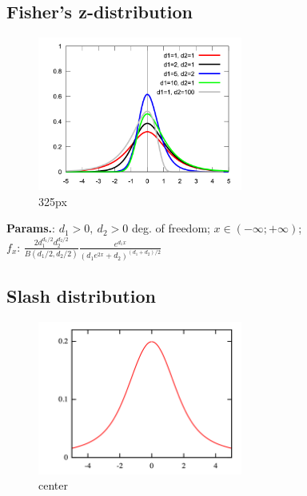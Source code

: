     
        
\subsection{Fisher's z-distribution}


    \begin{figure}[H]
        \centering
        \includegraphics[width=0.6\textwidth]{images/FisherZDistriPDF.png}
        \caption{325px}
    \end{figure}




    {\color{darkblue} \textbf{Params.}:} {$d_1>0,\ d_2>0$ deg. of freedom}; {$x \in (-\infty; +\infty)\!$};\hspace{0.5cm}\\{\color{darkblue} \textbf{$f_x$}:} {$\frac{2d_1^{d_1/2}d_2^{d_2/2}}{B(d_1/2,d_2/2)}\frac{e^{d_1x}}{\left(d_1e^{2x}+d_2\right)^{\left(d_1+d_2\right)/2}}\!$}



    
        
\subsection{Slash distribution}


    \begin{figure}[H]
        \centering
        \includegraphics[width=0.6\textwidth]{images/Slashpdf.png}
        \caption{center}
    \end{figure}




